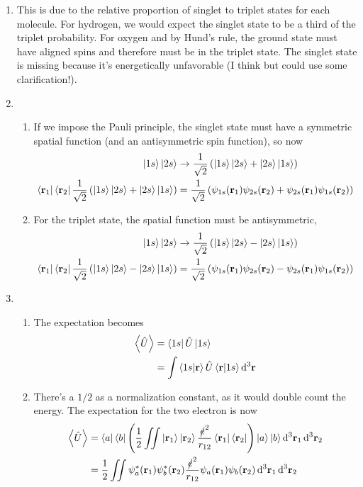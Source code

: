 \documentclass{homework}
\begin{document}
\begin{enumerate}
		\item This is due to the relative proportion of singlet to triplet states for each molecule. For hydrogen, we would expect the singlet state to be a third of the triplet probability. For oxygen and by Hund's rule, the ground state must have aligned spins and therefore must be in the triplet state. The singlet state is missing because it's energetically unfavorable (I think but could use some clarification!).
		
		\item \begin{enumerate}
			\item If we impose the Pauli principle, the singlet state must have a symmetric spatial function (and an antisymmetric spin function), so now \begin{align*}
				\ket{1s}\ket{2s} & \to \frac{1}{\sqrt{2}} \left(\ket{1s}\ket{2s} + \ket{2s}\ket{1s}\right) \\
				\bra{\boldsymbol{\mathrm{r}}_1} \bra{\boldsymbol{\mathrm{r}}_2} \frac{1}{\sqrt{2}} \left(\ket{1s}\ket{2s} + \ket{2s}\ket{1s}\right) & = \frac{1}{\sqrt{2}} \left(\psi_{1s}(\boldsymbol{\mathrm{r}}_1) \psi_{2s}(\boldsymbol{\mathrm{r}}_2) + \psi_{2s}(\boldsymbol{\mathrm{r}}_1) \psi_{1s}(\boldsymbol{\mathrm{r}}_2) \right)
			\end{align*}
		
			\item For the triplet state, the spatial function must be antisymmetric, \begin{align*}
				\ket{1s}\ket{2s} & \to \frac{1}{\sqrt{2}} \left(\ket{1s}\ket{2s} - \ket{2s}\ket{1s}\right) \\
								\bra{\boldsymbol{\mathrm{r}}_1} \bra{\boldsymbol{\mathrm{r}}_2} \frac{1}{\sqrt{2}} \left(\ket{1s}\ket{2s} - \ket{2s}\ket{1s}\right) & = \frac{1}{\sqrt{2}} \left(\psi_{1s}(\boldsymbol{\mathrm{r}}_1) \psi_{2s}(\boldsymbol{\mathrm{r}}_2) - \psi_{2s}(\boldsymbol{\mathrm{r}}_1) \psi_{1s}(\boldsymbol{\mathrm{r}}_2) \right)
			\end{align*}
		\end{enumerate}
	
		\item \begin{enumerate}
			\item The expectation becomes \begin{align*}
				\expval{\hat{U}} & = \bra{1s} \hat{U} \ket{1s} \\
					& = \int \braket{1s}{\boldsymbol{\mathrm{r}}} \hat{U} \braket{\boldsymbol{\mathrm{r}}}{1s} \dd[3]{ \boldsymbol{\mathrm{r}} }
			\end{align*}
			\item There's a $1/2$ as a normalization constant, as it would double count the energy. The expectation for the two electron is now \begin{align*}
				\expval{\hat{U}} & = \bra{a}\bra{b} \left(\frac{1}{2}\iint \ket{\boldsymbol{\mathrm{r}}_1}\ket{\boldsymbol{\mathrm{r}}_2}\frac{\slashed{e}^2}{r_{12}}
				\bra{\boldsymbol{\mathrm{r}}_1} \bra{\boldsymbol{\mathrm{r}}_2}
				\right) \ket{a} \ket{b} \dd[3]{ \boldsymbol{\mathrm{r}} _1} \dd[3]{ \boldsymbol{\mathrm{r}} _2} \\
				& = \frac{1}{2} \iint \psi_a^*(\boldsymbol{\mathrm{r}}_1) \psi_b^*(\boldsymbol{\mathrm{r}}_2) \frac{\slashed{e}^2}{r_{12}} \psi_a(\boldsymbol{\mathrm{r}}_1) \psi_b(\boldsymbol{\mathrm{r}}_2) \dd[3]{ \boldsymbol{\mathrm{r}} _1} \dd[3]{ \boldsymbol{\mathrm{r}} _2}
			\end{align*}
		\end{enumerate}
	

\end{enumerate}
\end{document}
